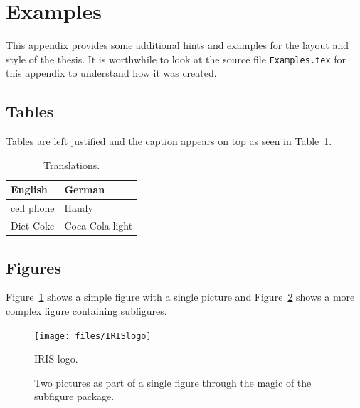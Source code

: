 \section{Examples}
\label{s:Examples}

This appendix provides some additional hints and examples for the
layout and style of the thesis. It is worthwhile to look at the source
file \verb|Examples.tex| for this appendix to understand how it was
created.



\subsection{Tables}

Tables are left justified and the caption appears on top as seen in
Table~\ref{t:Translations}.

\begin{table}[ht] %
\caption[Translations]{\label{t:Translations}Translations.}
\centering
\begin{tabular}{ll}
\hline
\textbf{English} & \textbf{German}\\
\hline
cell phone       & Handy\\
Diet Coke        & Coca Cola light\\
\hline
\end{tabular}
\end{table}



\subsection{Figures}

Figure~\ref{f:IRISlogo} shows a simple figure with a single picture
and Figure~\ref{f:SubfigureExample} shows a more complex figure
containing subfigures.

\begin{figure}[ht]
\centering
\texttt{[image: files/IRISlogo]}
\caption[IRIS logo]{\label{f:IRISlogo}IRIS logo.}
\end{figure}

\begin{figure}[ht]
\centering
{}\quad
{}
\caption[Subfigure example]{\label{f:SubfigureExample}Two pictures as
  part of a single figure through the magic of the subfigure package.}
\end{figure}



